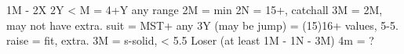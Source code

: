 1M - 2X
2Y < M = 4+Y any range
2M = min
2N = 15+, catchall
    3M = 2M, may not have extra. suit = MST+ 
any 3Y (may be jump) = (15)16+ values, 5-5.
raise = fit, extra.
3M = s-solid, < 5.5 Loser (at least 1M - 1N - 3M)
    4m = ?